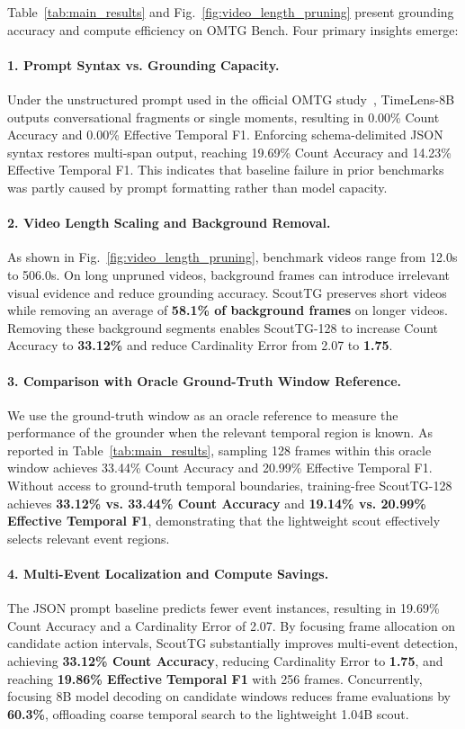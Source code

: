 Table~\ref{tab:main_results} and Fig.~\ref{fig:video_length_pruning} present grounding accuracy and compute efficiency on OMTG Bench. Four primary insights emerge:

\paragraph{1. Prompt Syntax vs. Grounding Capacity.} Under the unstructured prompt used in the official OMTG study~\cite{omtg2026}, TimeLens-8B outputs conversational fragments or single moments, resulting in 0.00\% Count Accuracy and 0.00\% Effective Temporal F1. Enforcing schema-delimited JSON syntax restores multi-span output, reaching 19.69\% Count Accuracy and 14.23\% Effective Temporal F1. This indicates that baseline failure in prior benchmarks was partly caused by prompt formatting rather than model capacity.

\paragraph{2. Video Length Scaling and Background Removal.} As shown in Fig.~\ref{fig:video_length_pruning}, benchmark videos range from 12.0s to 506.0s. On long unpruned videos, background frames can introduce irrelevant visual evidence and reduce grounding accuracy. ScoutTG preserves short videos while removing an average of \textbf{58.1\% of background frames} on longer videos. Removing these background segments enables ScoutTG-128 to increase Count Accuracy to \textbf{33.12\%} and reduce Cardinality Error from 2.07 to \textbf{1.75}.

\paragraph{3. Comparison with Oracle Ground-Truth Window Reference.} We use the ground-truth window as an oracle reference to measure the performance of the grounder when the relevant temporal region is known. As reported in Table~\ref{tab:main_results}, sampling 128 frames within this oracle window achieves 33.44\% Count Accuracy and 20.99\% Effective Temporal F1. Without access to ground-truth temporal boundaries, training-free ScoutTG-128 achieves \textbf{33.12\% vs. 33.44\% Count Accuracy} and \textbf{19.14\% vs. 20.99\% Effective Temporal F1}, demonstrating that the lightweight scout effectively selects relevant event regions.

\paragraph{4. Multi-Event Localization and Compute Savings.} The JSON prompt baseline predicts fewer event instances, resulting in 19.69\% Count Accuracy and a Cardinality Error of 2.07. By focusing frame allocation on candidate action intervals, ScoutTG substantially improves multi-event detection, achieving \textbf{33.12\% Count Accuracy}, reducing Cardinality Error to \textbf{1.75}, and reaching \textbf{19.86\% Effective Temporal F1} with 256 frames. Concurrently, focusing 8B model decoding on candidate windows reduces frame evaluations by \textbf{60.3\%}, offloading coarse temporal search to the lightweight 1.04B scout.

